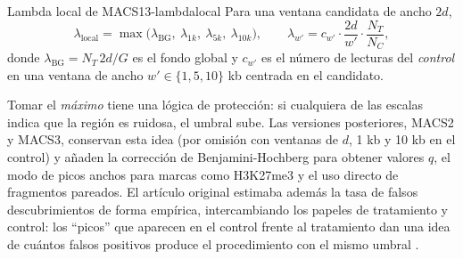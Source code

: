 \begin{definicion}{Lambda local de MACS}{13-lambdalocal}
Para una ventana candidata de ancho $2d$,
\begin{equation}\label{eq:13-lambdalocal}
\lambda_{\text{local}} = \max\bigl(\lambda_{\text{BG}},\ \lambda_{1k},\ \lambda_{5k},\ \lambda_{10k}\bigr),
\qquad
\lambda_{w'} = c_{w'}\cdot\frac{2d}{w'}\cdot\frac{N_T}{N_C},
\end{equation}
donde $\lambda_{\text{BG}}=N_T\,2d/G$ es el fondo global y $c_{w'}$ es el número de lecturas del \emph{control} en una ventana de ancho $w'\in\{1, 5, 10\}$ kb centrada en el candidato.
\end{definicion}

\begin{simbolos}
\end{simbolos}

Tomar el \emph{máximo} tiene una lógica de protección: si cualquiera de las escalas indica que la región es ruidosa, el umbral sube. Las versiones posteriores, MACS2 y MACS3, conservan esta idea (por omisión con ventanas de $d$, 1 kb y 10 kb en el control) y añaden la corrección de Benjamini-Hochberg para obtener valores $q$, el modo de picos anchos para marcas como H3K27me3 y el uso directo de fragmentos pareados. El artículo original estimaba además la tasa de falsos descubrimientos de forma empírica, intercambiando los papeles de tratamiento y control: los ``picos'' que aparecen en el control frente al tratamiento dan una idea de cuántos falsos positivos produce el procedimiento con el mismo umbral \parencite{c13-zhang2008}.

